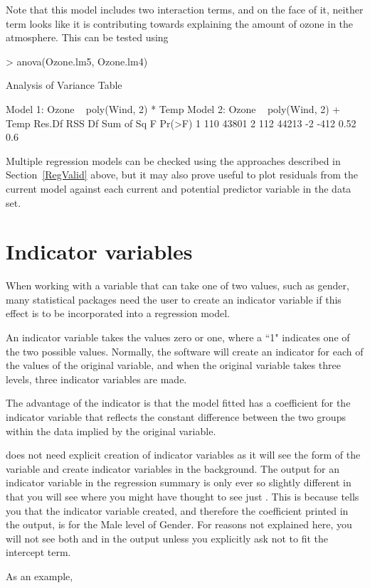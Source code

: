 Note that this model includes two interaction terms, and on the face of it, neither term looks like it is contributing towards explaining the amount of ozone in the atmosphere. This can be tested using 

\begin{Schunk}
\begin{Sinput}
> anova(Ozone.lm5, Ozone.lm4) 
\end{Sinput}
\begin{Soutput}
Analysis of Variance Table

Model 1: Ozone ~ poly(Wind, 2) * Temp
Model 2: Ozone ~ poly(Wind, 2) + Temp
  Res.Df   RSS Df Sum of Sq    F Pr(>F)
1    110 43801                         
2    112 44213 -2      -412 0.52    0.6
\end{Soutput}
\end{Schunk}

 
Multiple regression models can be checked using the approaches described in Section~\ref{RegValid} above, but it may also prove useful to plot residuals from the current model against each current and potential predictor variable in the data set. 
 
\section{Indicator variables} 
 
When working with a variable that can take one of two values, such as gender, many statistical packages need the user to create an indicator variable if this effect is to be incorporated into a regression model. 
 
An indicator variable takes the values zero or one, where a ``1" indicates one of the two possible values. Normally, the software will create an indicator for each of the values of the original variable, and when the original variable takes three levels, three indicator variables are made.  
 
The advantage of the indicator is that the model fitted has a coefficient for the indicator variable that reflects the constant difference between the two groups within the data implied by the original variable. 
 
\R{} does not need explicit creation of indicator variables as it will see the form of the variable and create indicator variables in the background. The output for an indicator variable in the regression summary is only ever so slightly different in that you will see  where you might have thought to see just . This is because \R{} tells you that the indicator variable created, and therefore the coefficient printed in the output, is for the Male level of Gender. For reasons not explained here, you will not see both  and  in the output unless you explicitly ask \R{} not to fit the intercept term. 
 
As an example, 
 



